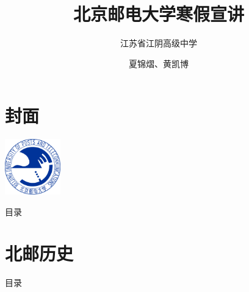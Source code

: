 \documentclass[aspectratio=169, utf8]{beamer}
\title[北京邮电大学]{北京邮电大学寒假宣讲}
\subtitle{江苏省江阴高级中学}
\author{夏锦熠、黄凯博}
\institute[网络空间安全学院]{北京邮电大学网络空间安全学院}
\date{}
\begin{document}
\section*{封面}

\begin{frame}
    \centering
    \vspace{1em}
    \includegraphics[width=0.18\textwidth]{./resources/logo.png}\\[0pt]
    \titlepage
\end{frame}

\setlength{\parskip}{0.5em}

\begin{frame}{目录}
    \begin{multicols}{2}
        \tableofcontents
    \end{multicols}
\end{frame}

\section{北邮历史}

\begin{frame}{目录}
    \begin{multicols}{2}
        \tableofcontents[sectionstyle=show,subsectionstyle=hide,currentsection]
    \end{multicols}
\end{frame}
\end{document}
